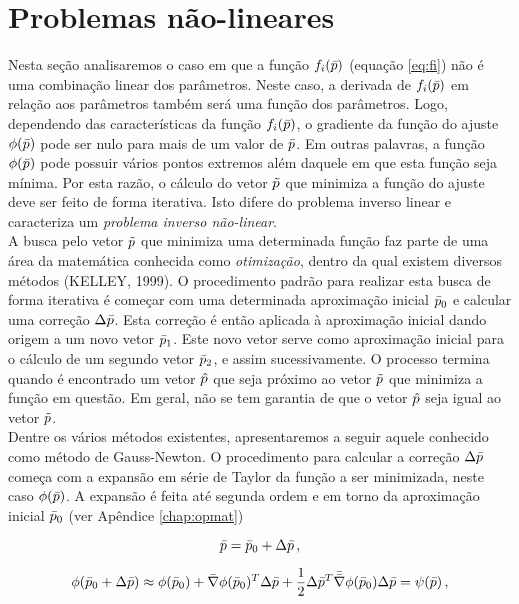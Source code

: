 \section{Problemas não-lineares}

Nesta seção analisaremos o caso em que a função $f_i(\bar{p})$
(equação \ref{eq:fi}) não é uma combinação linear dos parâmetros.
Neste caso, a derivada de $f_i(\bar{p})$ em relação aos parâmetros também será
uma função dos parâmetros.
Logo, dependendo das características da função $f_i(\bar{p})$, o gradiente da
função do ajuste $\phi(\bar{p})$ pode ser nulo para mais de um valor de
$\bar{p}$.
Em outras palavras, a função $\phi(\bar{p})$ pode possuir
vários pontos extremos além daquele em que esta função seja mínima.
Por esta razão, o cálculo do vetor $\tilde{p}$ que minimiza a função do ajuste deve
ser feito de forma iterativa.
Isto difere do problema inverso linear e caracteriza um {\it problema inverso
não-linear}.
\\
\indent A busca pelo vetor $\tilde{p}$ que minimiza uma determinada função faz
parte de uma área da matemática conhecida como {\it otimização}, dentro da qual
existem diversos métodos (KELLEY, 1999).
O procedimento padrão para realizar esta busca de forma iterativa é começar com
uma determinada aproximação inicial $\bar{p}_0$ e calcular uma correção
$\Delta\bar{p}$.
Esta correção é então aplicada à aproximação inicial dando origem a um novo vetor
$\bar{p}_1$.
Este novo vetor serve como aproximação inicial para o cálculo de um segundo
vetor $\bar{p}_2$, e assim sucessivamente.
O processo termina quando é encontrado um vetor $\hat{p}$ que seja próximo ao
vetor $\tilde{p}$ que minimiza a função em questão.
Em geral, não se tem garantia de que o vetor $\hat{p}$ seja igual ao vetor
$\tilde{p}$.
\\
\indent Dentre os vários métodos existentes, apresentaremos a seguir aquele
conhecido como método de Gauss-Newton.
O procedimento para calcular a correção $\Delta\bar{p}$ começa com a
expansão em série de Taylor da função a ser minimizada, neste caso $\phi(\bar{p})$.
A expansão é feita até segunda ordem e em torno da aproximação inicial $\bar{p}_0$
(ver Apêndice \ref{chap:opmat})

\begin{equation}
\bar{p} =  \bar{p}_0 + \Delta\bar{p} \thinspace ,
\end{equation}

\begin{equation}
\phi(\bar{p}_0 + \Delta\bar{p}) \approx \phi(\bar{p}_0) +
    \bar{\nabla}\phi(\bar{p}_0)^T\Delta\bar{p} +
    \dfrac{1}{2}\Delta\bar{p}^T\bar{\bar{\nabla}}\phi(\bar{p}_0)\Delta\bar{p}
= \psi(\bar{p}) \thinspace ,
\label{eq:taylor}
\end{equation}


